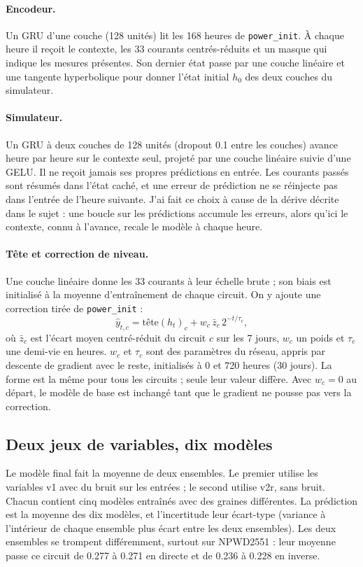 \documentclass[11pt,a4paper]{article}
\newcommand{\code}[1]{\texttt{#1}}
\begin{document}
\paragraph{Encodeur.} Un GRU d'une couche (128 unités) lit les 168 heures de \code{power\_init}. À chaque heure il reçoit le contexte, les 33 courants centrés-réduits et un masque qui indique les mesures présentes. Son dernier état passe par une couche linéaire et une tangente hyperbolique pour donner l'état initial $h_0$ des deux couches du simulateur.

\paragraph{Simulateur.} Un GRU à deux couches de 128 unités (dropout 0.1 entre les couches) avance heure par heure sur le contexte seul, projeté par une couche linéaire suivie d'une GELU. Il ne reçoit jamais ses propres prédictions en entrée. Les courants passés sont résumés dans l'état caché, et une erreur de prédiction ne se réinjecte pas dans l'entrée de l'heure suivante. J'ai fait ce choix à cause de la dérive décrite dans le sujet : une boucle sur les prédictions accumule les erreurs, alors qu'ici le contexte, connu à l'avance, recale le modèle à chaque heure.

\paragraph{Tête et correction de niveau.} Une couche linéaire donne les 33 courants à leur échelle brute ; son biais est initialisé à la moyenne d'entraînement de chaque circuit. On y ajoute une correction tirée de \code{power\_init} :
\[
\hat y_{t,c} = \mathrm{tête}(h_t)_c + w_c \,\bar z_c \, 2^{-t/\tau_c},
\]
où $\bar z_c$ est l'écart moyen centré-réduit du circuit $c$ sur les 7 jours, $w_c$ un poids et $\tau_c$ une demi-vie en heures. $w_c$ et $\tau_c$ sont des paramètres du réseau, appris par descente de gradient avec le reste, initialisés à 0 et 720 heures (30 jours). La forme est la même pour tous les circuits ; seule leur valeur diffère. Avec $w_c = 0$ au départ, le modèle de base est inchangé tant que le gradient ne pousse pas vers la correction.

\subsection{Deux jeux de variables, dix modèles}

Le modèle final fait la moyenne de deux ensembles. Le premier utilise les variables v1 avec du bruit sur les entrées ; le second utilise v2r, sans bruit. Chacun contient cinq modèles entraînés avec des graines différentes. La prédiction est la moyenne des dix modèles, et l'incertitude leur écart-type (variance à l'intérieur de chaque ensemble plus écart entre les deux ensembles). Les deux ensembles se trompent différemment, surtout sur NPWD2551 : leur moyenne passe ce circuit de 0.277 à 0.271 en directe et de 0.236 à 0.228 en inverse.
\end{document}
